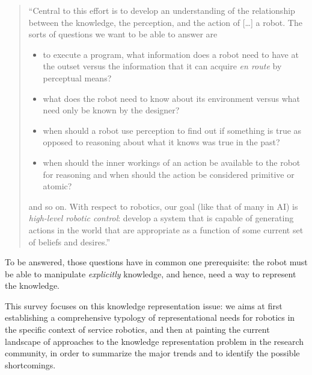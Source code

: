 \documentclass[a4paper, twocolumn]{article}
\begin{document}
\begin{quotation}

    ``Central to this effort is to develop an understanding of the relationship
    between the knowledge, the perception, and the action of [\ldots] a robot. The
    sorts of questions we want to be able to answer are

    \begin{itemize} 

        \item to execute a program, what information does a robot need to have
        at the outset versus the information that it can acquire \emph{en route}
        by perceptual means?

        \item what does the robot need to know about its environment versus what
        need only be known by the designer?

        \item when should a robot use perception to find out if something is
        true as opposed to reasoning about what it knows was true in the past?

        \item when should the inner workings of an action be available to the
        robot for reasoning and when should the action be considered primitive
        or atomic?

    \end{itemize}

    and so on. With respect to robotics, our goal (like that of many in AI) is
    \emph{high-level robotic control}: develop a system that is capable of
    generating actions in the world that are appropriate as a function of some
    current set of beliefs and desires.''

\end{quotation}

To be answered, those questions have in common one prerequisite: the robot must
be able to manipulate \emph{explicitly} knowledge, and hence, need a way to
represent the knowledge.

This survey focuses on this knowledge representation issue: we aims at first
establishing a comprehensive typology of representational needs for
robotics in the specific context of service robotics, and then at painting the
current landscape of approaches to the knowledge representation problem in the
research community, in order to summarize the major trends and to identify the
possible shortcomings.
\end{document}
